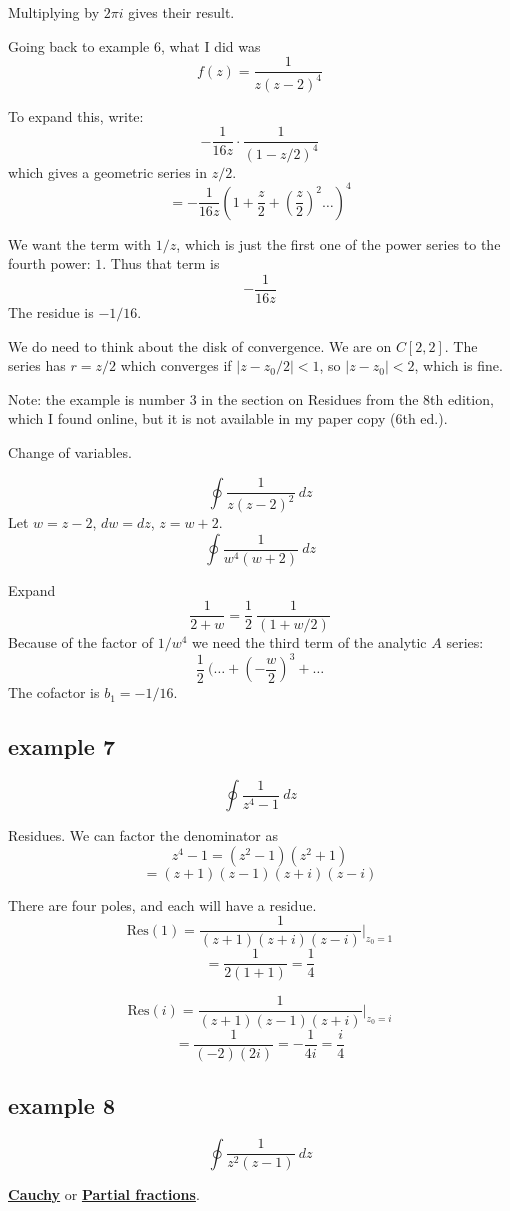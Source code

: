 \documentclass[11pt, oneside]{article}
\begin{document}
Multiplying by $2 \pi i$ gives their result.

Going back to example 6, what I did was
\[ f(z) = \frac{1}{z(z-2)^4} \]

To expand this, write:
\[ -\frac{1}{16z} \cdot \frac{1}{(1 - z/2)^4} \]
which gives a geometric series in $z/2$.  
\[ = -\frac{1}{16z} (1 + \frac{z}{2} + (\frac{z}{2})^2 \dots)^4 \]

We want the term with $1/z$, which is just the first one of the power series to the fourth power:  $1$.  Thus that term is
\[   -\frac{1}{16z}  \]
The residue is $-1/16$.

We do need to think about the disk of convergence.  We are on $C[2,2]$.  The series has $r = z/2$ which converges if $|z - z_0/2| < 1$, so $|z - z_0| < 2$, which is fine.

Note:  the example is number 3 in the section on Residues from the 8th edition, which I found online, but it is not available in my paper copy (6th ed.).

Change of variables.

\[ \oint \frac{1}{z(z - 2)^2} \ dz \]
Let $w = z - 2$, $dw = dz$, $z = w + 2$.
\[ \oint \frac{1}{w^4(w + 2)} \ dz \]

Expand
\[ \frac{1}{2 + w} = \frac{1}{2} \ \frac{1}{(1 + w/2)} \]
Because of the factor of $1/w^4$ we need the third term of the analytic $A$ series:
\[ \frac{1}{2} \ (\dots + (-\frac{w}{2})^3 + \dots \]
The cofactor is $b_1 = -1/16$.

\subsection*{example 7}
\[ \oint \frac{1}{z^4 - 1} \ dz \]

Residues.  We can factor the denominator as
\[ z^4 - 1 = (z^2 - 1)(z^2 + 1) \]
\[ = (z+1)(z-1)(z+i)(z-i) \]

There are four poles, and each will have a residue.
\[ \text{Res}(1) =  \frac{1}{(z+1)(z+i)(z-i)} \bigg |_{z_0 = 1} \]
\[ = \frac{1}{2(1+1)} = \frac{1}{4} \]

\[ \text{Res}(i) = \frac{1}{(z+1)(z-1)(z+i)} \bigg |_{z_0 = i}\]
\[ = \frac{1}{(-2)(2i)} = -\frac{1}{4i} = \frac{i}{4}  \]

\subsection*{example 8}
\[ \oint \frac{1}{z^2(z - 1)} \ dz \]

\hyperref[sec:ex8C]{\textbf{Cauchy}} or \hyperref[sec:ex8PF]{\textbf{Partial fractions}}.
\end{document}
